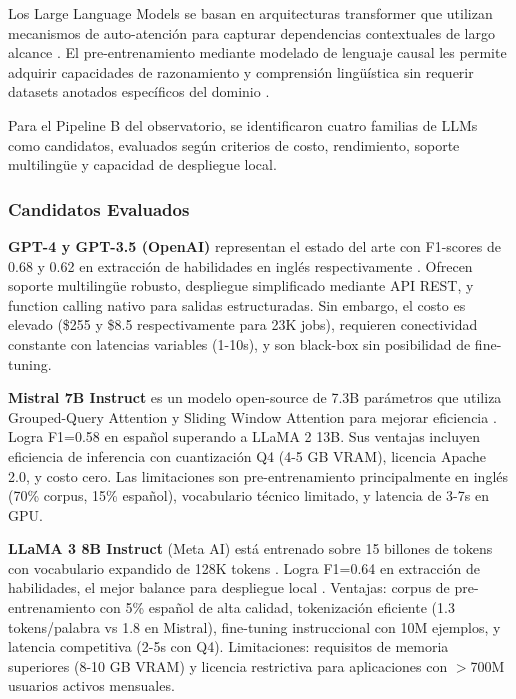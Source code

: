 Los Large Language Models se basan en arquitecturas transformer que utilizan mecanismos de auto-atención para capturar dependencias contextuales de largo alcance \cite{vaswani2017}. El pre-entrenamiento mediante modelado de lenguaje causal les permite adquirir capacidades de razonamiento y comprensión lingüística sin requerir datasets anotados específicos del dominio \cite{brown2020, wei2022emergent}.

Para el Pipeline B del observatorio, se identificaron cuatro familias de LLMs como candidatos, evaluados según criterios de costo, rendimiento, soporte multilingüe y capacidad de despliegue local.

\subsubsection{Candidatos Evaluados}

\textbf{GPT-4 y GPT-3.5 (OpenAI)} representan el estado del arte con F1-scores de 0.68 y 0.62 en extracción de habilidades en inglés respectivamente \cite{openai2023gpt4, zhang2023}. Ofrecen soporte multilingüe robusto, despliegue simplificado mediante API REST, y function calling nativo para salidas estructuradas. Sin embargo, el costo es elevado (\$255 y \$8.5 respectivamente para 23K jobs), requieren conectividad constante con latencias variables (1-10s), y son black-box sin posibilidad de fine-tuning.

\textbf{Mistral 7B Instruct} es un modelo open-source de 7.3B parámetros que utiliza Grouped-Query Attention y Sliding Window Attention para mejorar eficiencia \cite{jiang2023mistral}. Logra F1=0.58 en español superando a LLaMA 2 13B. Sus ventajas incluyen eficiencia de inferencia con cuantización Q4 (4-5 GB VRAM), licencia Apache 2.0, y costo cero. Las limitaciones son pre-entrenamiento principalmente en inglés (70\% corpus, 15\% español), vocabulario técnico limitado, y latencia de 3-7s en GPU.

\textbf{LLaMA 3 8B Instruct} (Meta AI) está entrenado sobre 15 billones de tokens con vocabulario expandido de 128K tokens \cite{touvron2023llama3}. Logra F1=0.64 en extracción de habilidades, el mejor balance para despliegue local \cite{nguyen2024}. Ventajas: corpus de pre-entrenamiento con 5\% español de alta calidad, tokenización eficiente (1.3 tokens/palabra vs 1.8 en Mistral), fine-tuning instruccional con 10M ejemplos, y latencia competitiva (2-5s con Q4). Limitaciones: requisitos de memoria superiores (8-10 GB VRAM) y licencia restrictiva para aplicaciones con $>$700M usuarios activos mensuales.

